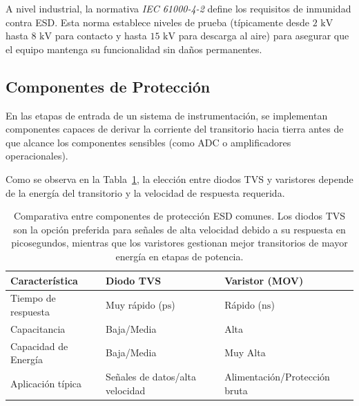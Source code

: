 A nivel industrial, la normativa \emph{IEC 61000-4-2} define los requisitos de inmunidad contra ESD. Esta norma establece niveles de prueba (típicamente desde $2\text{ kV}$ hasta $8\text{ kV}$ para contacto y hasta $15\text{ kV}$ para descarga al aire) para asegurar que el equipo mantenga su funcionalidad sin daños permanentes.

\subsection{Componentes de Protección}

En las etapas de entrada de un sistema de instrumentación, se implementan componentes capaces de derivar la corriente del transitorio hacia tierra antes de que alcance los componentes sensibles (como ADC o amplificadores operacionales).

Como se observa en la Tabla~\ref{tab:comparativa_esd}, la elección entre diodos TVS y varistores depende de la energía del transitorio y la velocidad de respuesta requerida.

\begin{table}[!ht]
    \centering
    \small
    \forcerectofloat %
    \caption[Comparativa entre componentes de protección ESD.]{Comparativa entre componentes de protección ESD comunes. Los diodos TVS son la opción preferida para señales de alta velocidad debido a su respuesta en picosegundos, mientras que los varistores gestionan mejor transitorios de mayor energía en etapas de potencia.\protect\label{tab:comparativa_esd}}
    \setlength{\tabcolsep}{3pt}
    \begin{tabularx}{\linewidth}{@{} >{\centering\arraybackslash}X >{\centering\arraybackslash}X >{\centering\arraybackslash}X @{}}
        \toprule
        \textbf{Característica} & \textbf{Diodo TVS} & \textbf{Varistor (MOV)} \\
        \midrule
        Tiempo de respuesta & Muy rápido ($\text{ps}$) & Rápido ($\text{ns}$) \\
        Capacitancia & Baja/Media & Alta \\
        Capacidad de Energía & Baja/Media & Muy Alta \\
        Aplicación típica & Señales de datos/alta velocidad & Alimentación/Protección bruta \\
        \bottomrule
    \end{tabularx}
   
\end{table}

